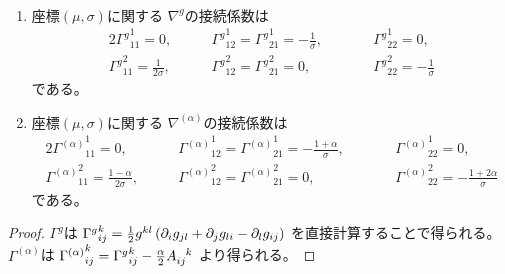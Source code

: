 \documentclass[report]{jlreq}
\begin{document}
\begin{proposition}[接続係数]
    ~
    \begin{enumerate}
        \item 座標$(\mu, \sigma)$に関する
            $\nabla^g$の接続係数は
            \begin{alignat}{2}
                {\Gamma^{g}}_{11}^1
                    = 0,
                    &\qquad
                        {\Gamma^{g}}_{12}^1
                            = {\Gamma^{g}}_{21}^1
                            = -\frac{1}{\sigma},
                    &&\qquad
                        {\Gamma^{g}}_{22}^1
                            = 0,
                    \\
                {\Gamma^{g}}_{11}^2
                    = \frac{1}{2\sigma},
                    &\qquad
                        {\Gamma^{g}}_{12}^2
                            = {\Gamma^{g}}_{21}^2
                            = 0,
                    &&\qquad
                        {\Gamma^{g}}_{22}^2
                            = -\frac{1}{\sigma}
            \end{alignat}
            である。
        \item 座標$(\mu, \sigma)$に関する
            $\nabla^{(\alpha)}$の接続係数は
            \begin{alignat}{2}
                {\Gamma^{(\alpha)}}_{11}^1
                    = 0,
                    &\qquad
                        {\Gamma^{(\alpha)}}_{12}^1
                            = {\Gamma^{(\alpha)}}_{21}^1
                            = - \frac{1 + \alpha}{\sigma},
                    &&\qquad
                        {\Gamma^{(\alpha)}}_{22}^1
                            = 0,
                    \\
                {\Gamma^{(\alpha)}}_{11}^2
                    = \frac{1 - \alpha}{2 \sigma},
                    &\qquad
                        {\Gamma^{(\alpha)}}_{12}^2
                            = {\Gamma^{(\alpha)}}_{21}^2
                            = 0,
                    &&\qquad
                        {\Gamma^{(\alpha)}}_{22}^2
                            = - \frac{1 + 2\alpha}{\sigma}
            \end{alignat}
            である。
    \end{enumerate}
\end{proposition}

\begin{proof}
    $\Gamma^g$は
    ${\Gamma^g}_{ij}^k
        = \frac{1}{2} g^{kl} \left({
            \partial_i g_{jl}
            + \partial_j g_{li}
            - \partial_l g_{ij}
        }\right)$
    を直接計算することで得られる。
    $\Gamma^{(\alpha)}$は
    ${\Gamma^{(\alpha)}}_{ij}^k
        = {\Gamma^g}_{ij}^k - \frac{\alpha}{2} A_{ij}^{\hphantom{ij}k}$
    より得られる。
\end{proof}
\end{document}
